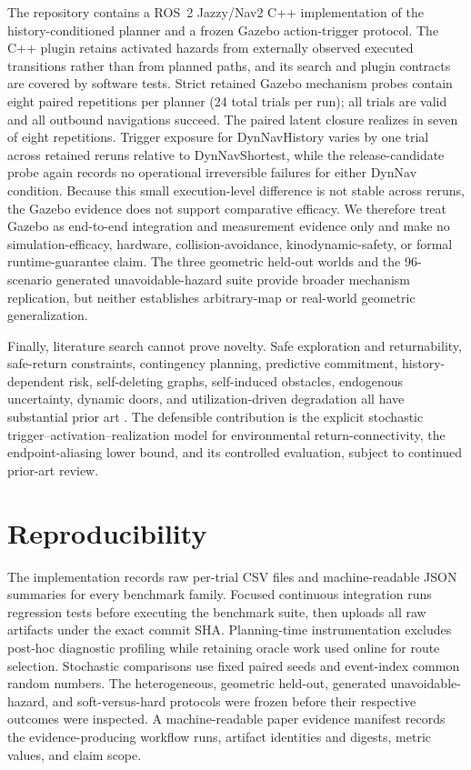 \documentclass[conference]{IEEEtran}
\begin{document}
The repository contains a ROS~2 Jazzy/Nav2 C++ implementation of the history-conditioned planner and a frozen Gazebo action-trigger protocol. The C++ plugin retains activated hazards from externally observed executed transitions rather than from planned paths, and its search and plugin contracts are covered by software tests. Strict retained Gazebo mechanism probes contain eight paired repetitions per planner (24 total trials per run); all trials are valid and all outbound navigations succeed. The paired latent closure realizes in seven of eight repetitions. Trigger exposure for DynNavHistory varies by one trial across retained reruns relative to DynNavShortest, while the release-candidate probe again records no operational irreversible failures for either DynNav condition. Because this small execution-level difference is not stable across reruns, the Gazebo evidence does not support comparative efficacy. We therefore treat Gazebo as end-to-end integration and measurement evidence only and make no simulation-efficacy, hardware, collision-avoidance, kinodynamic-safety, or formal runtime-guarantee claim. The three geometric held-out worlds and the 96-scenario generated unavoidable-hazard suite provide broader mechanism replication, but neither establishes arbitrary-map or real-world geometric generalization.

Finally, literature search cannot prove novelty. Safe exploration and returnability, safe-return constraints, contingency planning, predictive commitment, history-dependent risk, self-deleting graphs, self-induced obstacles, endogenous uncertainty, dynamic doors, and utilization-driven degradation all have substantial prior art \cite{moldovan2012safe,zhang2022online,guo2023safereturn,xiao2020risk,carmesin2023selfdeleting,dvorak2025selfdeleting,frenkel2026selfinduced,jung2025contingency,srirangam2026scramppi,han2026rcsp,baldes2024fallible,liu2021door,doan2022endogenous}. The defensible contribution is the explicit stochastic trigger--activation--realization model for environmental return-connectivity, the endpoint-aliasing lower bound, and its controlled evaluation, subject to continued prior-art review.

\section{Reproducibility}
The implementation records raw per-trial CSV files and machine-readable JSON summaries for every benchmark family. Focused continuous integration runs regression tests before executing the benchmark suite, then uploads all raw artifacts under the exact commit SHA. Planning-time instrumentation excludes post-hoc diagnostic profiling while retaining oracle work used online for route selection. Stochastic comparisons use fixed paired seeds and event-index common random numbers. The heterogeneous, geometric held-out, generated unavoidable-hazard, and soft-versus-hard protocols were frozen before their respective outcomes were inspected. A machine-readable paper evidence manifest records the evidence-producing workflow runs, artifact identities and digests, metric values, and claim scope.
\end{document}
